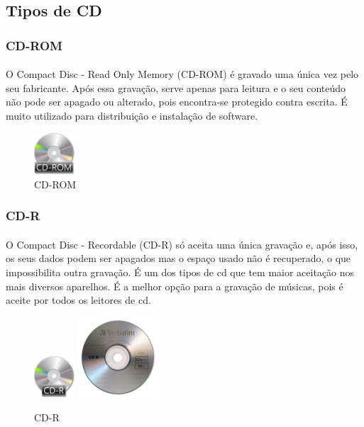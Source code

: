 \documentclass[a4paper]{report}
\begin{document}
\subsection{Tipos de CD}

\vspace*{7mm}

\subsubsection{CD-ROM} 
\paragraph*{}O Compact Disc - Read Only Memory (CD-ROM) é gravado uma única vez pelo seu fabricante. Após essa gravação, serve apenas para leitura e o seu conteúdo não pode ser apagado ou alterado, pois encontra-se protegido contra escrita. É muito utilizado para distribuição e instalação de software.

\begin{figure}[H]
\center
\includegraphics[width=1.5cm]{Imagens/cd-rom.jpg}
\caption{CD-ROM}
\end{figure}

\subsubsection{CD-R} 
\paragraph*{}O Compact Disc - Recordable (CD-R) só aceita uma única gravação e, após isso, os seus dados podem ser apagados mas o espaço usado não é recuperado, o que impossibilita outra gravação. É um dos tipos de \ac{cd} que tem maior aceitação nos mais diversos aparelhos. É a melhor opção para a gravação de músicas, pois é aceite por todos os leitores de \ac{cd}.

\begin{figure}[H]
\center
\includegraphics[width=1.5cm]{Imagens/cd-r.jpg}
\includegraphics[width=3cm]{Imagens/cd-r-ex.jpeg}
\caption{CD-R}
\end{figure}
\end{document}
